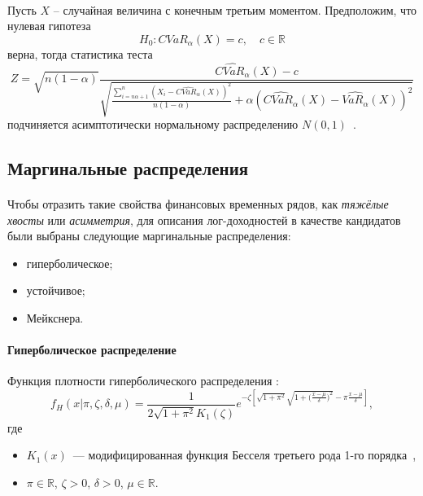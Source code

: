 \documentclass[aspectratio=169]{beamer}
\begin{document}
\begin{frame}{\insertsection}
    \framesubtitle{\insertsubsection}
    Пусть $X$ -- случайная величина с конечным третьим моментом. 
    Предположим, что нулевая гипотеза $$H_0: \textit{CVaR}_\alpha (X) = c, \quad c \in \mathbb{R}$$ верна,
    тогда статистика теста 
    \begin{equation}
        Z = \sqrt{n(1-\alpha)} \frac{\widehat{\textit{CVaR}_\alpha}(X) - c}{\sqrt{\frac{\sum_{i=n\alpha+1}^n (X_i - \widehat{\textit{CVaR}_\alpha}(X))^2}{n(1-\alpha)} + \alpha \left(\widehat{\textit{CVaR}_\alpha}(X) - \widehat{\textit{VaR}_\alpha}(X)\right)^2}}
        \nonumber
    \end{equation}
    подчиняется асимптотически нормальному распределению $N(0, 1)$~\cite{Mirtes16}.
\end{frame}

\subsection{Маргинальные распределения}

\begin{frame}{\insertsection}
    \framesubtitle{\insertsubsection}
    Чтобы отразить такие свойства финансовых временных рядов, как \textit{тяжёлые хвосты} или \textit{асимметрия}, для описания лог-доходностей в качестве кандидатов были выбраны следующие маргинальные распределения:
    \begin{itemize}
        \item гиперболическое;
        \item устойчивое;
        \item Мейкснера.
    \end{itemize}
\end{frame}

\begin{frame}{\insertsection}
    \framesubtitle{Гиперболическое распределение}
    Функция плотности гиперболического распределения \cite{Barndoff1983}:
    \begin{equation}
        f_H(x|\pi,\zeta,\delta,\mu) = \frac{1}{2 \sqrt{1+\pi^2} K_1(\zeta)} e^{-\zeta \left[ \sqrt{1+\pi^2} \sqrt{1 + \big( \frac{x - \mu}{\delta})^2} - \pi \frac{x - \mu}{\delta} \right]},
    \end{equation}
    где
    \begin{itemize}
        \item $K_1(x)$~--- модифицированная функция Бесселя третьего рода 1-го порядка~\cite{Bessel1824}, 
        \item $\pi \in \mathbb{R}$, $\zeta > 0$, $\delta > 0$, $\mu \in \mathbb{R}$.
    \end{itemize}
\end{frame}
\end{document}
